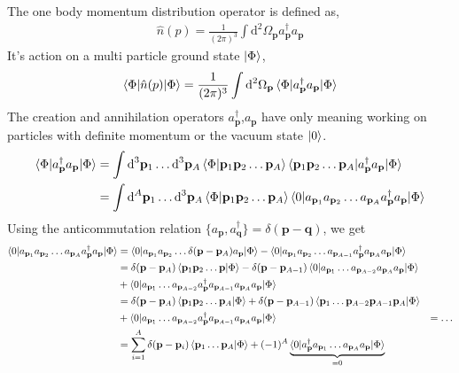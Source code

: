 \documentclass[10pt]{article}
\begin{document}
The one body momentum distribution operator is defined as,
\begin{align}
	\hat{n}(p) = \frac{1}{(2 \pi)^{3}} \int \textrm{d}^{2} \Omega_{\mathbf{p}} a_{\mathbf{p}}^{\dagger} a_{\mathbf{p}}
\end{align}
It's action on a multi particle ground state $\ket{\Phi}$,
\begin{align}
	\braket{ \Phi | \hat{n}(p) | \Phi} = \frac{1}{(2 \pi)^{3}} \int \textrm{d}^{2} \Omega_{\mathbf{p}} \braket{ \Phi | a_{\mathbf{p}}^{\dagger} a_{\mathbf{p}} | \Phi}
\end{align}
The creation and annihilation operators $a_{\mathbf{p}}^{\dagger}$,$a_{\mathbf{p}}$ have only meaning working on particles with definite momentum or the vacuum state $\ket{0}$.
\begin{align}
	\braket{ \Phi | a_{\mathbf{p}}^{\dagger} a_{\mathbf{p}} | \Phi} &= \int \textrm{d}^{3} \mathbf{p}_{1} \ldots \textrm{d}^{3} \mathbf{p}_{A} \braket {\Phi | \mathbf{p}_1 \mathbf{p}_2 \ldots \mathbf{p}_{A}} \braket{ \mathbf{p}_{1} \mathbf{p}_{2} \ldots \mathbf{p}_{A} | a_{\mathbf{p}}^{\dagger} a_{\mathbf{p}} | \Phi } \\
	&= \int \textrm{d}^{A} \mathbf{p}_{1} \ldots \textrm{d}^{3} \mathbf{p}_{A} \braket {\Phi | \mathbf{p}_1 \mathbf{p}_2 \ldots \mathbf{p}_{A}} \braket{ 0 | a_{\mathbf{p}_{1}} a_{\mathbf{p}_{2}} \ldots a_{\mathbf{p}_{A}} a_{\mathbf{p}}^{\dagger} a_{\mathbf{p}} | \Phi } 
\end{align}
Using the anticommutation relation $\{ a_{\mathbf{p}} ,a_{\mathbf{q}}^{\dagger} \} = \delta(\mathbf{p}-\mathbf{q})$, we get
\begin{align}
	\braket{0 | a_{\mathbf{p}_{1}} a_{\mathbf{p}_{2}} \ldots a_{\mathbf{p}_{A}} a_{\mathbf{p}}^{\dagger} a_{\mathbf{p}} | \Phi} &=
	\braket{0 | a_{\mathbf{p}_{1}} a_{\mathbf{p}_{2}} \ldots \delta(\mathbf{p}-\mathbf{p}_{A}) a_{\mathbf{p}} | \Phi} - \braket{0 | a_{\mathbf{p}_{1}} a_{\mathbf{p}_{2}} \ldots a_{\mathbf{p}_{A-1}} a_{\mathbf{p}}^{\dagger} a_{\mathbf{p}_{A}} a_{\mathbf{p}} | \Phi} \\
	&= \delta(\mathbf{p}-\mathbf{p}_{A}) \braket{\mathbf{p}_{1} \mathbf{p}_{2} \ldots \mathbf{p} | \Phi } - \delta(\mathbf{p}-\mathbf{p}_{A-1}) \braket{0 | a_{\mathbf{p}_1} \ldots a_{\mathbf{p}_{A-2}} a_{\mathbf{p}_{A}} a_{\mathbf{p}} | \Phi} \\
	&+ \braket{0| a_{\mathbf{p}_1} \ldots a_{\mathbf{p}_{A-2}} a_{\mathbf{p}}^{\dagger} a_{\mathbf{p}_{A-1}} a_{\mathbf{p}_{A}} a_{\mathbf{p}} | \Phi} \\
 &= \delta(\mathbf{p}-\mathbf{p}_{A}) \braket{\mathbf{p}_{1} \mathbf{p}_{2} \ldots \mathbf{p}_{A} | \Phi } + \delta(\mathbf{p}-\mathbf{p}_{A-1}) \braket{\mathbf{p}_{1} \ldots \mathbf{p}_{A-2} \mathbf{p}_{A-1} \mathbf{p}_{A} | \Phi} \\
	&+ \braket{0| a_{\mathbf{p}_1} \ldots a_{\mathbf{p}_{A-2}} a_{\mathbf{p}}^{\dagger} a_{\mathbf{p}_{A-1}} a_{\mathbf{p}_{A}} a_{\mathbf{p}} | \Phi}
	&= \ldots \\
	&= \sum_{i=1}^{A} \delta(\mathbf{p} - \mathbf{p}_{i}) \braket{ \mathbf{p}_{1} \ldots \mathbf{p}_{A} | \Phi} + (-1)^{A} \underbrace{\braket{ 0 | a_{\mathbf{p}}^{\dagger} a_{\mathbf{p}_1} \ldots a_{\mathbf{p}_{A}} a_{\mathbf{p}} | \Phi}}_{=0}
\end{align}
\end{document}

